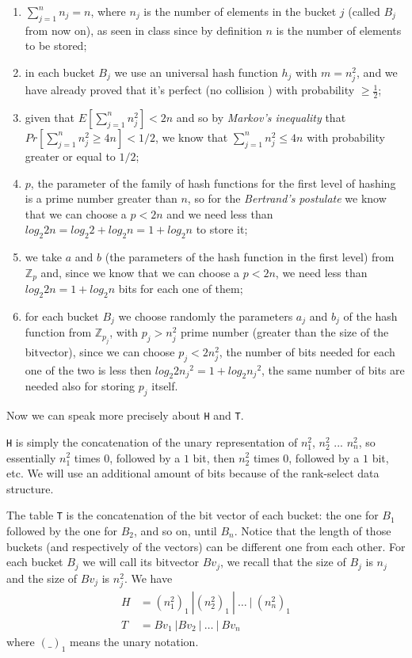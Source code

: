 \documentclass[a4paper]{article}
\begin{document}
\begin{enumerate}
\item $\sum_{j=1}^{n}n_j=n$, where $n_j$ is the number of elements in the bucket $j$ (called $B_j$ from now on), as seen in class since by definition $n$ is the number of elements to be stored;
\item in each bucket $B_j$ we use an universal hash function $h_j$ with $m=n_j^2$, and we have already proved that it's perfect (no collision
) with probability $\geq \frac{1}{2}$;
\item 
given that $E[\sum_{j=1}^{n}n_j^2] < 2n$ and so by \textit{Markov’s inequality} that $Pr[\sum_{j=1}^{n}n_j^2 \geq 4n] < 1/2$, we know that $\sum_{j=1}^{n}n_j^2 \leq 4n$ with probability greater or equal to $1/2$;
\item
$p$, the parameter of the family of hash functions for the first level of hashing is a prime number greater than $n$, so for the \textit{Bertrand's postulate} we know that we can choose a $p < 2n$ and we need less than $log_2 2n = log_2 2 + log_2 n = 1 + log_2 n$ to store it;
\item
we take $a$ and $b$ (the parameters of the hash function in the first level) from $\mathbb{Z}_p$ and, since we know that we can choose a $p < 2n$, we need less than $log_2 2n = 1 + log_2 n$ bits for each one of them;
\item
for each bucket $B_j$ we choose randomly the parameters $a_j$ and $b_j$ of the hash function from $\mathbb{Z}_{p_j}$, with $p_j > n_j^2$ prime number  (greater than the size of the bitvector), since we can choose $p_j < 2n_j^2$, the number of bits needed for each one of the two is less then $log_2  2{n_j}^2 = 1 + log_2 {n_j}^2$, the same number of bits are needed also for storing $p_j$ itself.

\end{enumerate}
Now we can speak more precisely about \texttt{H} and \texttt{T}.

\texttt{H} is simply the concatenation of the unary representation of $n_1^2$, $n_2^2$ ... $n_n^2$, so essentially $n_1^2$ times $0$, followed by a $1$ bit, then $n_2^2$ times $0$, followed by a $1$ bit, etc.
We will use an additional amount of bits because of the rank-select data structure.

The table \texttt{T} is the concatenation of the bit vector of each bucket: the one for $B_1$ followed by the one for $B_2$, and so on, until $B_n$.
Notice that the length of those buckets (and respectively of the vectors) can be different one from each other.
For each bucket $B_j$ we will call its bitvector $Bv_j$, we recall that the size of $B_j$ is $n_j$ and the size of $Bv_j$ is $n_j^2$.
We have
\begin{align*}
H &= (n_1^2)_1 \ | (n_2^2)_1 \ | \ \dots \ | \ (n_n^2)_1 \\
T &= Bv_1 \ | Bv_2 \ | \ \dots \ | \ Bv_n
\end{align*}
where $(\_)_1$ means the unary notation.
\end{document}

